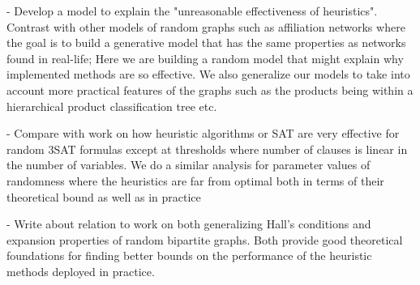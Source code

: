 - Develop a model to explain the "unreasonable effectiveness of heuristics". Contrast with other models of random graphs such as affiliation networks where the goal is to build a generative model that has the same properties as networks found in real-life; Here we are building a random model that might explain why implemented methods are so effective. We also generalize our models to take into account more practical features of the graphs such as the products being within a hierarchical product classification tree etc.

- Compare with work on how heuristic algorithms or SAT are very effective for random 3SAT formulas except at thresholds where number of clauses is linear in the number of variables. We do a similar analysis for parameter values of randomness where the heuristics are far from optimal both in terms of their theoretical bound as well as in practice

- Write about relation to work on both generalizing Hall's conditions and expansion properties of random bipartite graphs. Both provide good theoretical foundations for finding better bounds on the performance of the heuristic methods deployed in practice.







